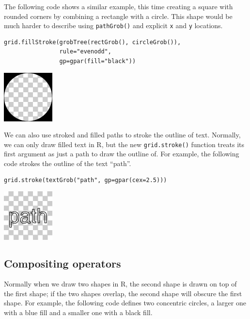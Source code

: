The following code shows a similar example, this time creating a
square with rounded corners by combining a rectangle with a circle.
This shape would be much harder to describe using \texttt{pathGrob()} and
explicit \texttt{x} and \texttt{y} locations.

\begin{verbatim}
grid.fillStroke(grobTree(rectGrob(), circleGrob()),
                rule="evenodd",
                gp=gpar(fill="black"))
\end{verbatim}

\includegraphics{murrell-definitions-2023_files/figure-latex/unnamed-chunk-25-1.png}

We can also use stroked and filled paths to stroke the outline
of text. Normally, we can only draw filled text in R, but the new
\texttt{grid.stroke()} function treats its first argument as just a path
to draw the outline of. For example, the following code strokes the
outline of the text ``path''.

\begin{verbatim}
grid.stroke(textGrob("path", gp=gpar(cex=2.5)))
\end{verbatim}

\includegraphics{murrell-definitions-2023_files/figure-latex/unnamed-chunk-26-1.png}

\hypertarget{compositing-operators}{%
\subsection{Compositing operators}\label{compositing-operators}}

Normally when we draw two shapes in R, the second shape is drawn on
top of the first shape; if the two shapes overlap, the second shape
will obscure the first shape.
For example, the following code defines two concentric circles,
a larger one with a blue fill and a smaller one with a black fill.

